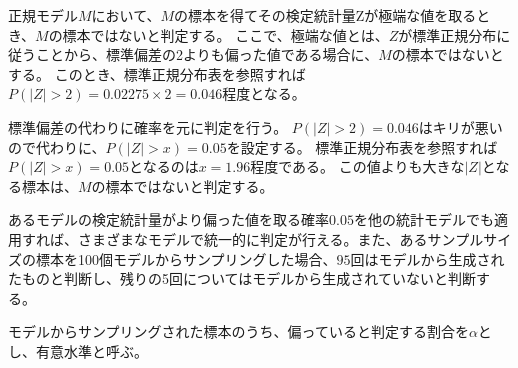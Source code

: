 正規モデル$M$において、$M$の標本を得てその検定統計量Zが極端な値を取るとき、$M$の標本ではないと判定する。
ここで、極端な値とは、$Z$が標準正規分布に従うことから、標準偏差の2よりも偏った値である場合に、$M$の標本ではないとする。
このとき、標準正規分布表を参照すれば$P(|Z|>2)=0.02275\times 2=0.046$程度となる。

標準偏差の代わりに確率を元に判定を行う。
$P(|Z|>2)=0.046$はキリが悪いので代わりに、$P(|Z|>x)=0.05$を設定する。
標準正規分布表を参照すれば$P(|Z|>x)=0.05$となるのは$x=1.96$程度である。
この値よりも大きな$|Z|$となる標本は、$M$の標本ではないと判定する。

あるモデルの検定統計量がより偏った値を取る確率$0.05$を他の統計モデルでも適用すれば、さまざまなモデルで統一的に判定が行える。また、あるサンプルサイズの標本を100個モデルからサンプリングした場合、$95$回はモデルから生成されたものと判断し、残りの5回についてはモデルから生成されていないと判断する。


\begin{defi}
 モデルからサンプリングされた標本のうち、偏っていると判定する割合を$\alpha$とし、有意水準と呼ぶ。
\end{defi}







